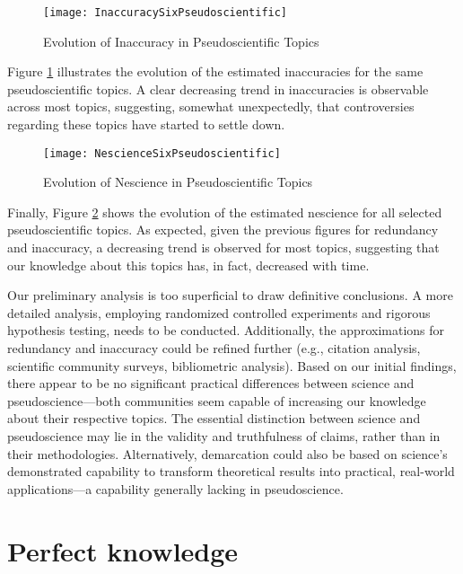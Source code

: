 \begin{figure}[H]
\centering\texttt{[image: InaccuracySixPseudoscientific]}
\caption{\label{fig:inaccuracy_six_pseudoscientific}Evolution of Inaccuracy in Pseudoscientific Topics}
\end{figure}

Figure \ref{fig:inaccuracy_six_pseudoscientific} illustrates the evolution of the estimated inaccuracies for the same pseudoscientific topics. A clear decreasing trend in inaccuracies is observable across most topics, suggesting, somewhat unexpectedly, that controversies regarding these topics have started to settle down. 

\begin{figure}[H]
\centering\texttt{[image: NescienceSixPseudoscientific]}
\caption{\label{fig:nescience_six_pseudoscientific}Evolution of Nescience in Pseudoscientific Topics}
\end{figure}

Finally, Figure \ref{fig:nescience_six_pseudoscientific} shows the evolution of the estimated nescience for all selected pseudoscientific topics. As expected, given the previous figures for redundancy and inaccuracy, a decreasing trend is observed for most topics, suggesting that our knowledge about this topics has, in fact, decreased with time.

Our preliminary analysis is too superficial to draw definitive conclusions. A more detailed analysis, employing randomized controlled experiments and rigorous hypothesis testing, needs to be conducted. Additionally, the approximations for redundancy and inaccuracy could be refined further (e.g., citation analysis, scientific community surveys, bibliometric analysis). Based on our initial findings, there appear to be no significant practical differences between science and pseudoscience—both communities seem capable of increasing our knowledge about their respective topics. The essential distinction between science and pseudoscience may lie in the validity and truthfulness of claims, rather than in their methodologies. Alternatively, demarcation could also be based on science's demonstrated capability to transform theoretical results into practical, real-world applications—a capability generally lacking in pseudoscience.

%
%
\section{Perfect knowledge}

